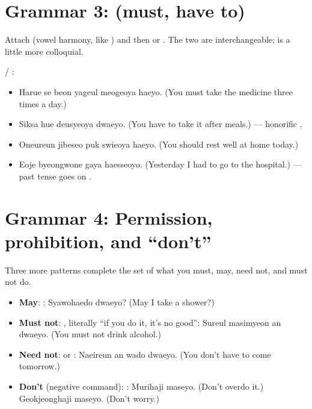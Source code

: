 \section{Grammar 3:  (must, have to)}

Attach  (vowel harmony, like ) and then  or
. The two are interchangeable;  is a little more colloquial.

\begin{example}[Obligation]
 / :
\begin{itemize}
  \item {} Harue se beon yageul meogeoya haeyo. (You must
        take the medicine three times a day.)
  \item {} Siksa hue deusyeoya dwaeyo. (You have to take it after
        meals.) --- honorific .
  \item {} Oneureun jibeseo puk swieoya haeyo. (You
        should rest well at home today.)
  \item {} Eoje byeongwone gaya haesseoyo. (Yesterday I had to
        go to the hospital.) --- past tense goes on .
\end{itemize}
\end{example}

\section{Grammar 4: Permission, prohibition, and ``don't''}

Three more patterns complete the set of what you must, may, need not, and must not do.
\begin{itemize}
  \item \textbf{May}: :  Syawohaedo dwaeyo? (May
        I take a shower?)
  \item \textbf{Must not}: , literally ``if you do it, it's no
        good'':  Sureul masimyeon an dwaeyo. (You must not drink
        alcohol.)
  \item \textbf{Need not}:  or :  Naeireun an wado dwaeyo. (You don't have to come tomorrow.)
  \item \textbf{Don't} (negative command): : 
        Murihaji maseyo. (Don't overdo it.)  Geokjeonghaji maseyo.
        (Don't worry.)
\end{itemize}

